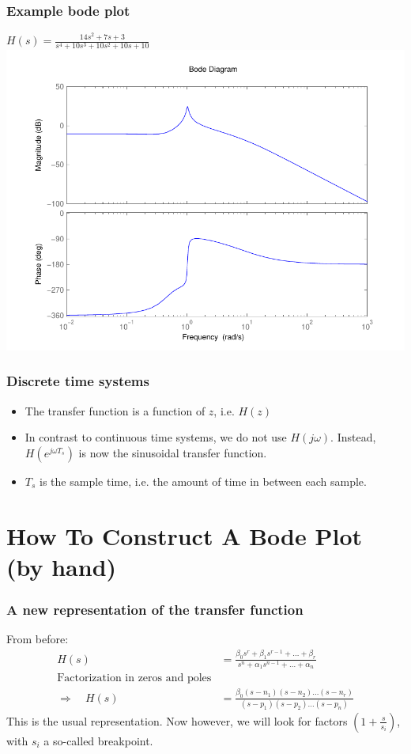 \begin{frame}
\frametitle{Example bode plot}
$H(s) = \frac{14s^2 + 7s + 3}{s^4 + 10s^3 + 10s^2 + 10s + 10}$
\includegraphics[scale=0.5]{ExampleBode1}


\end{frame}


\begin{frame}
\frametitle{Discrete time systems}

\begin{itemize}
\item The transfer function is a function of $z$, i.e. $H(z)$
\item In contrast to continuous time systems, we do not use $H(j\omega)$. Instead, $H(e^{j\omega T_s})$ is now the sinusoidal transfer function.
\item $T_s$ is the sample time, i.e. the amount of time in between each sample.
\end{itemize}


\end{frame}

\section{How To Construct A Bode Plot (by hand)}

\begin{frame}
\frametitle{A new representation of the transfer function}
From before:
\begin{align*}
H(s) &= \frac{\beta_0 s^r + \beta_1 s^{r-1} + \ldots + \beta_r}{s^n + \alpha_1 s^{n-1} + \ldots + \alpha_n}\\
\text{Factorization in zeros and poles}\\
\Rightarrow \quad
H(s) &= \frac{\beta_0 (s-n_1) (s-n_2) \ldots (s-n_r)}{(s-p_1) (s-p_2) \ldots (s-p_n)}
\end{align*}
This is the usual representation. Now however, we will look for factors $(1+\displaystyle{\frac{s}{s_i}})$, with $s_i$ a so-called breakpoint.


\end{frame}


